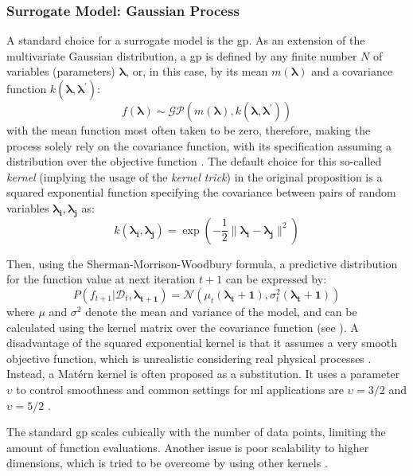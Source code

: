 \subsubsection{Surrogate Model: Gaussian Process}
A standard choice for a surrogate model is the \gls{gp}. As an extension of the multivariate Gaussian distribution, a \gls{gp} is defined by any finite number $N$ of variables (parameters) $\mathbf{\lambda}$, or, in this case, by its mean $m(\mathbf{\lambda})$ and a covariance function $k(\mathbf{\lambda},\mathbf{\lambda}^{\prime})$:
\begin{equation}
	f(\mathbf{\lambda}) \sim \mathcal{GP}(m(\mathbf{\lambda}), k(\mathbf{\lambda},\mathbf{\lambda}^{\prime}))
\end{equation}
with the mean function most often taken to be zero, therefore, making the process solely rely on the covariance function, with its specification assuming a distribution over the objective function \cite{williams2006gaussian}. The default choice for this so-called \textit{kernel} (implying the usage of the \textit{kernel trick}) in the original proposition is a squared exponential function specifying the covariance between pairs of random variables $\mathbf{\lambda_i},\mathbf{\lambda_j}$ as:
\begin{equation}
	k(\mathbf{\lambda_i},\mathbf{\lambda_j}) = \exp \left(  -\frac{1}{2} \lVert \mathbf{\lambda_i} - \mathbf{\lambda_j} \rVert^2 \right) 
\end{equation}

Then, using the Sherman-Morrison-Woodbury formula, a predictive distribution for the function value at next iteration $t+1$ can be expressed by:
\begin{equation}
	P(f_{t+1} | \mathcal{D}_t, \mathbf{\lambda_{t+1}} ) = \mathcal{N}(\mu_t(\mathbf{\lambda_t+1}), \sigma^2_t(\mathbf{\lambda_t+1}))
\end{equation}
where $\mu$ and $\sigma^2$ denote the mean and variance of the model, and can be calculated using the kernel matrix over the covariance function (see \cite[p.8]{brochu2010tutorial}).
A disadvantage of the squared exponential kernel is that it assumes a very smooth objective function, which is unrealistic considering real physical processes \cite{stein1999interpolation}.  
Instead, a Matérn kernel is often proposed as a substitution. It uses a parameter $\upsilon$ to control  smoothness and common settings for \gls{ml} applications are $\upsilon = 3/2$ and $\upsilon=5/2$ \cite{williams2006gaussian}.

The standard \gls{gp} scales cubically with the number of data points, limiting the amount of function evaluations. Another issue is poor scalability to higher dimensions, which is tried to be overcome by using other kernels \cite{feurer2019hyperparameter}.


